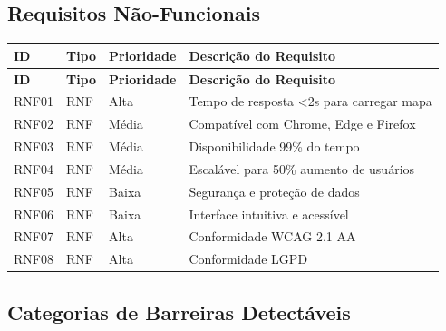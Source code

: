 \documentclass[12pt,a4paper]{article}
\begin{document}
\subsection{Requisitos Não-Funcionais}

\begin{longtable}{|>{\raggedright\arraybackslash}p{1.4cm}|>{\raggedright\arraybackslash}p{1.1cm}|>{\centering\arraybackslash}p{2.4cm}|>{\raggedright\arraybackslash}p{6.8cm}|}
\hline
\textbf{ID} & \textbf{Tipo} & \textbf{Prioridade} & \textbf{Descrição do Requisito} \\
\hline
\endfirsthead

\hline
\textbf{ID} & \textbf{Tipo} & \textbf{Prioridade} & \textbf{Descrição do Requisito} \\
\hline
\endhead

RNF01 & RNF & Alta & Tempo de resposta \textless{}2s para carregar mapa \\
\hline
RNF02 & RNF & Média & Compatível com Chrome, Edge e Firefox \\
\hline
RNF03 & RNF & Média & Disponibilidade 99\% do tempo \\
\hline
RNF04 & RNF & Média & Escalável para 50\% aumento de usuários \\
\hline
RNF05 & RNF & Baixa & Segurança e proteção de dados \\
\hline
RNF06 & RNF & Baixa & Interface intuitiva e acessível \\
\hline
RNF07 & RNF & Alta & Conformidade WCAG 2.1 AA \\
\hline
RNF08 & RNF & Alta & Conformidade LGPD \\
\hline
\end{longtable}

\subsection{Categorias de Barreiras Detectáveis}
\end{document}

